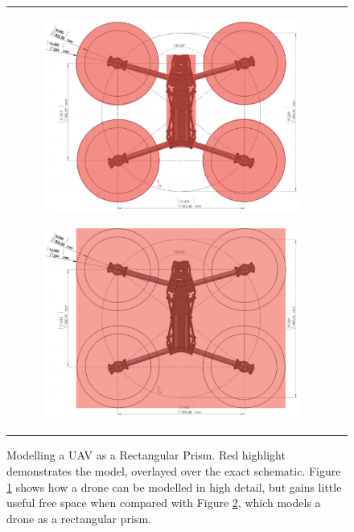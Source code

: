 
\begin{figure}[H]
\begin{centering}

\begin{tabular}{cc}
\begin{subfigure}{0.45\linewidth}
    \includegraphics[width=\linewidth]{appendices/rrt/img/DroneNegSpace.png}
    \caption{}
    \label{subfig:dronenegspace}
\end{subfigure}
\begin{subfigure}{0.45\linewidth}
    \includegraphics[width=\linewidth]{appendices/rrt/img/DroneRecPrism.png}
    \caption{}
    \label{subfig:dronerecprism}
\end{subfigure}
\end{tabular}
\caption[Modelling a UAV as a Rectangular Prism]{Modelling a \gls{UAV} as a Rectangular Prism. Red highlight demonstrates the model, overlayed over the exact schematic. Figure \ref{subfig:dronenegspace} shows how a drone can be modelled in high detail, but gains little useful free space when compared with Figure \ref{subfig:dronerecprism}, which models a drone as a rectangular prism.\cite{Thingbits}}
\label{fig:dronemodelling}

\end{centering}
\end{figure}